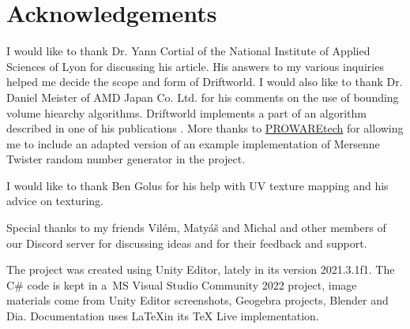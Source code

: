 \section*{Acknowledgements}

I would like to thank Dr. Yann Cortial of the National Institute of Applied Sciences of Lyon for discussing his article. His answers to my various inquiries helped me decide the scope and form of Driftworld. I would also like to thank Dr. Daniel Meister of AMD Japan Co. Ltd. for his comments on the use of bounding volume hiearchy algorithms. Driftworld implements a part of an algorithm described in one of his publications \cite{meister}. More thanks to \href{https://www.prowaretech.com}{PROWAREtech} for allowing me to include an adapted version of an example implementation of Mersenne Twister random number generator in the project.

I would like to thank Ben Golus for his help with UV texture mapping and his advice on texturing. %

Special thanks to my friends Vilém, Matyáš and Michal and other members of our Discord server for discussing ideas and for their feedback and support.

The project was created using Unity Editor, lately in its version 2021.3.1f1. The C\# code is kept in a~MS Visual Studio Community 2022 project, image materials come from Unity Editor screenshots, Geogebra projects, Blender and Dia. Documentation uses \LaTeX\hspace*{0.3em}in its TeX Live implementation.